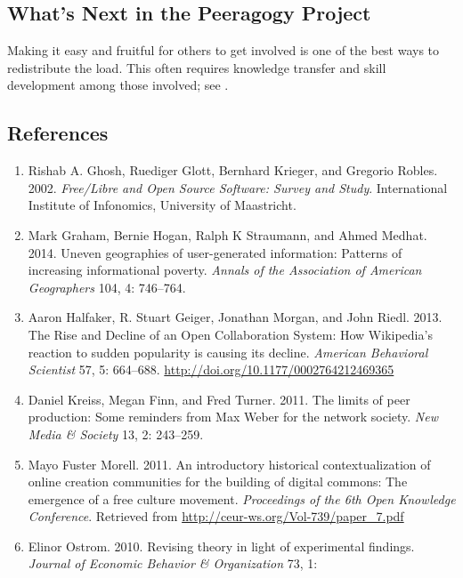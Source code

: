 \hypertarget{whats-next-in-the-peeragogy-project}{%
\subsection{What's Next in the Peeragogy
Project}\label{whats-next-in-the-peeragogy-project}}

Making it easy and fruitful for others to get involved is one of the
best ways to redistribute the load. This often requires knowledge
transfer and skill development among those involved; see .

\hypertarget{references}{%
\subsection{References}\label{references}}

\begin{enumerate}
\def\labelenumi{\arabic{enumi}.}
\item
  Rishab A. Ghosh, Ruediger Glott, Bernhard Krieger, and Gregorio
  Robles. 2002. \emph{Free/Libre and Open Source Software: Survey and
  Study}. International Institute of Infonomics, University of
  Maastricht.
\item
  Mark Graham, Bernie Hogan, Ralph K Straumann, and Ahmed Medhat. 2014.
  Uneven geographies of user-generated information: Patterns of
  increasing informational poverty. \emph{Annals of the Association of
  American Geographers} 104, 4: 746--764.
\item
  Aaron Halfaker, R. Stuart Geiger, Jonathan Morgan, and John Riedl.
  2013. The Rise and Decline of an Open Collaboration System: How
  Wikipedia's reaction to sudden popularity is causing its decline.
  \emph{American Behavioral Scientist} 57, 5: 664--688.
  \url{http://doi.org/10.1177/0002764212469365}
\item
  Daniel Kreiss, Megan Finn, and Fred Turner. 2011. The limits of peer
  production: Some reminders from Max Weber for the network society.
  \emph{New Media \& Society} 13, 2: 243--259.
\item
  Mayo Fuster Morell. 2011. An introductory historical contextualization
  of online creation communities for the building of digital commons:
  The emergence of a free culture movement. \emph{Proceedings of the 6th
  Open Knowledge Conference}. Retrieved from
  \url{http://ceur-ws.org/Vol-739/paper_7.pdf}
\item
  Elinor Ostrom. 2010. Revising theory in light of experimental
  findings. \emph{Journal of Economic Behavior \& Organization} 73, 1:

\end{enumerate}
